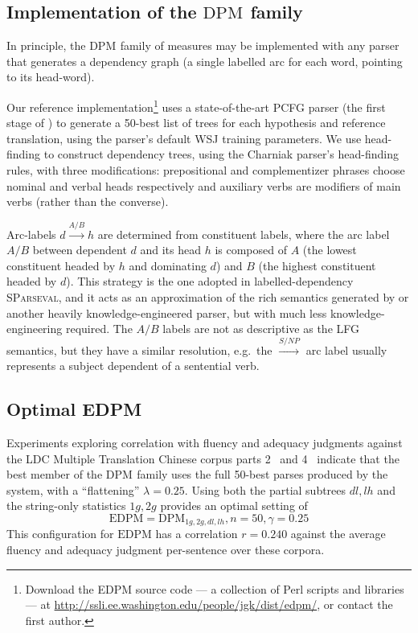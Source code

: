 \documentclass[11pt]{article}
\newcommand{\DPM}[1]{\ensuremath{\mathrm{DPM}_{#1}}}
\newcommand{\DPMempty}{\ensuremath{\DPM{}}}
\newcommand{\myEDPM}[0]{\ensuremath{\mathrm{EDPM}}}
\begin{document}
\subsection{Implementation of the \DPMempty{} family}
\label{sec:implementation}
In principle, the \DPM{} family of measures may be implemented with
any parser that generates a dependency graph (a single labelled arc
for each word, pointing to its head-word). 

Our reference implementation\footnote{Download the EDPM source code
  --- a collection of Perl scripts and libraries --- at
  \url{http://ssli.ee.washington.edu/people/jgk/dist/edpm/}, or contact
  the first author.}
uses a state-of-the-art PCFG parser (the first stage
of ) to generate a 50-best list of
trees for each hypothesis and reference translation, using the
parser's default WSJ %
training parameters.
%
We use  head-finding to construct
dependency trees, using the Charniak parser's head-finding rules, with
three modifications: prepositional and complementizer phrases choose
nominal and verbal heads respectively and auxiliary verbs are
modifiers of main verbs (rather than the converse).

Arc-labels $d
\stackrel{A/B}{\to} h$ are determined from constituent labels, where the arc
label $A/B$ between dependent $d$ and its head $h$ is composed of $A$
(the lowest constituent headed by $h$ and dominating $d$) and
$B$ (the highest constituent headed by $d$).
%
This strategy is the one adopted in labelled-dependency
\textsc{SParseval}, and it acts as an approximation of the rich
semantics generated by \cite{cahill04lfg} or another heavily
knowledge-engineered parser, but with much less knowledge-engineering
required.
%
The $A/B$ labels are not as descriptive as the LFG semantics, but they
have a similar resolution, e.g.\ the $\stackrel{S/NP}{\to}$ arc label
usually represents a subject dependent of a sentential verb.

\subsection{Optimal EDPM}
Experiments exploring correlation with fluency and adequacy judgments
against the LDC Multiple Translation Chinese corpus parts
2~\cite{LDC03MTC2} and 4~\cite{LDC06MTC4} indicate that the best
member of the \DPMempty{} family uses the full 50-best parses
produced by the system, with a ``flattening'' $\lambda=0.25$.  Using
both the partial subtrees $dl,lh$ and the string-only statistics
$1g,2g$ provides an optimal setting of
\begin{displaymath}
  \myEDPM{} = \DPM{1g,2g,dl,lh}, n=50, \gamma=0.25
\end{displaymath}
This configuration for \myEDPM{} has a correlation $r=0.240$ against the
average fluency and adequacy judgment per-sentence over these corpora.
\end{document}
